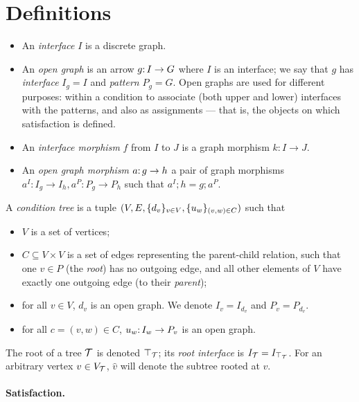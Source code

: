 \section{Definitions}
\label{sec:definitions}

\begin{itemize}
\item An \emph{interface} $I$ is a discrete graph.

\item An \emph{open graph} is an arrow $g{:}\, I\rightarrow G$ where $I$ is an interface; we say that $g$ has \emph{interface} $I_g=I$ and \emph{pattern} $P_g=G$. Open graphs are used for different purposes: within a condition to associate (both upper and lower) interfaces with the patterns, and also as assignments --- that is, the objects on which satisfaction is defined.

\item An \emph{interface morphism} $f$ from $I$ to $J$ is a graph morphism $k:I\to J$.

\item An \emph{open graph morphism} $a{:}\, g\rightarrow h$ a pair of graph morphisms $a^I:I_g\to I_h, a^P:P_g\to P_h$ such that $a^I;h=g;a^P$.
\end{itemize}
%
A \emph{condition tree} is a tuple $(V,E,\{{d_v}\}_{v\in V},\{{u_w}\}_{(v,w)\in C})$ such that

\begin{itemize}
\item $V$ is a set of vertices;

\item $C\subseteq V\times V$ is a set of edges representing the parent-child relation, such that one $v\in P$ (the \emph{root}) has no outgoing edge, and all other elements of $V$ have exactly one outgoing edge (to their \emph{parent});

\item for all $v\in V$, $d_v$ is an open graph. We denote $I_v=I_{d_v}$ and $P_v=P_{d_v}$.

\item for all $c=(v,w)\in C$, $u_w{:}\, I_w\rightarrow P_v$ is an open graph.
\end{itemize}
%
The root of a tree ${\mathcal{T}}$ is denoted $\top_{{\mathcal{T}}}$; its \emph{root interface} is $I_{\mathcal{T}}=I_{\top_{{\mathcal{T}}}}$. For an arbitrary vertex $v\in V_{\mathcal{T}}$, $\hat v$ will denote the subtree rooted at $v$.

\paragraph{Satisfaction.}

